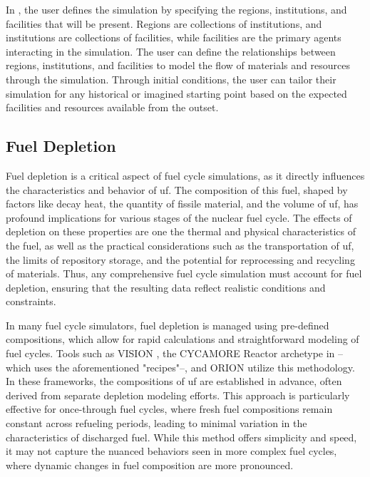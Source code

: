 
In \cyclus, the user defines the simulation by specifying the regions,
institutions, and facilities that will be present. Regions
are collections of institutions, and institutions are collections of
facilities, while facilities are the primary agents interacting in the
simulation. The user can define the relationships between regions,
institutions, and facilities to model the flow of materials and resources
through the simulation. Through initial conditions, the user can tailor their
simulation for any historical or imagined starting point based on the expected
facilities and resources available from the outset.

\subsection{Fuel Depletion}
\label{sec:depletion}

Fuel depletion is a critical aspect of fuel cycle simulations, as it directly
influences the characteristics and behavior of \gls{uf}. The composition of
this fuel, shaped by factors like decay heat, the quantity of fissile material,
and the volume of \gls{uf}, has profound implications for various stages of the
nuclear fuel cycle. The effects of depletion on these properties are one the
thermal and physical characteristics of the fuel, as well as the practical
considerations such as the transportation of \gls{uf}, the limits of repository
storage, and the potential for reprocessing and recycling of materials. Thus,
any comprehensive fuel cycle simulation must account for fuel depletion,
ensuring that the resulting data reflect realistic conditions and constraints.

In many fuel cycle simulators, fuel depletion is managed using pre-defined
compositions, which allow for rapid calculations and straightforward modeling
of fuel cycles. Tools such as VISION \cite{yacout_visionverifiable_2006}, the
CYCAMORE Reactor archetype in \cyclus--which uses the aforementioned
"recipes"--, and ORION utilize this methodology. In these frameworks, the
compositions of \gls{uf} are established in advance, often derived from
separate depletion modeling efforts. This approach is particularly effective
for once-through fuel cycles, where fresh fuel compositions remain constant
across refueling periods, leading to minimal variation in the characteristics
of discharged fuel. While this method offers simplicity and speed, it may not
capture the nuanced behaviors seen in more complex fuel cycles, where dynamic
changes in fuel composition are more pronounced.

